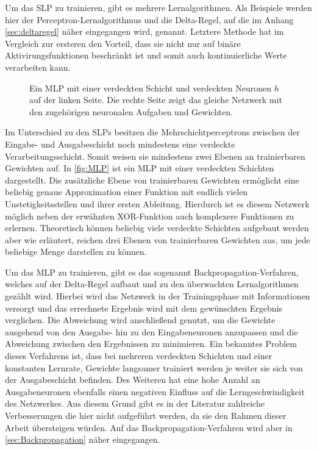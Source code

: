 Um das SLP zu trainieren, gibt es mehrere Lernalgorithmen. Als Beispiele werden hier der Perceptron-Lernalgorithmus und die Delta-Regel, auf die im Anhang \ref{sec:deltaregel} näher eingegangen wird, genannt. Letztere Methode hat im Vergleich zur ersteren den Vorteil, dass sie nicht nur auf binäre Aktivirungsfunktionen beschränkt ist und somit auch kontinuierliche Werte verarbeiten kann.
\\

\begin{figure}[!htb]
    \centering
        
    \caption[Darstellung eines MLP]{Ein MLP mit einer verdeckten Schicht und verdeckten Neuronen $h$ auf der linken Seite. Die rechte Seite zeigt das gleiche Netzwerk mit den zugehörigen neuronalen Aufgaben und Gewichten.}
    \label{fig:MLP}
\end{figure}

Im Unterschied zu den SLPs besitzen die Mehrschichtperceptrons zwischen der Eingabe- und Ausgabeschicht noch mindestens eine verdeckte Verarbeitungsschicht. Somit weisen sie mindestens zwei Ebenen an trainierbaren Gewichten auf. In \autoref{fig:MLP} ist ein MLP mit einer verdeckten Schichten dargestellt. Die zusätzliche Ebene von trainierbaren Gewichten ermöglicht eine beliebig genaue Approximation einer Funktion mit endlich vielen Unstetigkeitsstellen und ihrer ersten Ableitung. Hierdurch ist es diesem Netzwerk möglich neben der erwähnten XOR-Funktion auch komplexere Funktionen zu erlernen. Theoretisch können beliebig viele verdeckte Schichten aufgebaut werden aber wie \hbox{\citet{dkriesel07}} erläutert, reichen drei Ebenen von trainierbaren Gewichten aus, um jede beliebige Menge darstellen zu können.

Um das MLP zu trainieren, gibt es das sogenannt Backpropagation-Verfahren, welches auf der Delta-Regel aufbaut und zu den überwachten Lernalgorithmen gezählt wird. Hierbei wird das Netzwerk in der Trainingsphase mit Informationen versorgt und das errechnete Ergebnis wird mit dem gewünschten Ergebnis verglichen. Die Abweichung wird anschließend genutzt, um die Gewichte ausgehend von den Ausgabe- hin zu den Eingabeneuronen anzupassen und die Abweichung zwischen den Ergebnissen zu minimieren. Ein bekanntes Problem dieses Verfahrens ist, dass bei mehreren verdeckten Schichten und einer konstanten Lernrate, Gewichte langsamer trainiert werden je weiter sie sich von der Ausgabeschicht befinden. Des Weiteren hat eine hohe Anzahl an Ausgabeneuronen ebenfalls einen negativen Einfluss auf die Lerngeschwindigkeit des Netzwerkes. Aus diesem Grund gibt es in der Literatur zahlreiche Verbesserungen die hier nicht aufgeführt werden, da sie den Rahmen dieser Arbeit übersteigen würden. Auf das Backpropagation-Verfahren wird aber in \autoref{sec:Backpropagation} näher eingegangen. 


